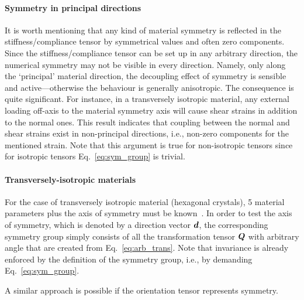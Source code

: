     \paragraph{Symmetry in principal directions} It is worth mentioning that any kind of material symmetry is reflected in the stiffness/compliance tensor by symmetrical values and often zero components. Since the stiffness/compliance tensor can be set up in any arbitrary direction, the numerical symmetry may not be visible in every direction. Namely, only along the `principal' material direction, the decoupling effect of symmetry is sensible and active---otherwise the behaviour is generally anisotropic. The consequence is quite significant. For instance, in a transversely isotropic material, any external loading off-axis to the material symmetry axis will cause shear strains in addition to the normal ones. This result indicates that coupling between the normal and shear strains exist in non-principal directions, i.e., non-zero components for the mentioned strain. Note that this argument is true for non-isotropic tensors since for isotropic tensors Eq.~\eqref{eq:sym_group} is trivial.

	\paragraph{Transversely-isotropic materials} For the case of transversely isotropic material (hexagonal crystals), 5 material parameters plus the axis of symmetry must be known~\autocite{Bohlke.2001}. In order to test the axis of symmetry, which is denoted by a direction vector $\tena{d}$, the corresponding symmetry group simply consists of all the transformation tensor $\tenb{Q}$ with arbitrary angle that are created from Eq.~\eqref{eq:arb_trans}. Note that invariance is already enforced by the definition of the symmetry group, i.e., by demanding Eq.~\eqref{eq:sym_group}.
	
	A similar approach is possible if the orientation tensor represents symmetry.
	
	
	
